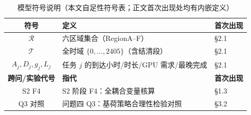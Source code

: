 
\begin{table}[ht]
\centering
\caption{模型符号说明（本文自足性符号表；正文首次出现处均有内嵌定义）}
\begin{tabular}{c l l}
\toprule
\textbf{符号} & \textbf{定义} & \textbf{首次出现} \\
\midrule
$\mathcal{R}$ & 六区域集合（RegionA--F） & §2.1 \\
$\mathcal{T}$ & 全时域 $\{0,\ldots,2405\}$（含结清段） & §2.1 \\
$A_j, D_j, g_j, L_j$ & 任务 $j$ 的到达小时/时长/GPU 需求/最晚完成 & §2.1 \\
\toprule
\textbf{跨问/实验代号} & \textbf{指代} & \textbf{首次出现} \\
\midrule
S2 F4 & S2 阶段 F4：全耦合变量核算 & §1.3 \\
Q3 对照 & 问题四 Q3：基荷策略合理性检验对照 & §3.2 \\
\bottomrule
\end{tabular}
\end{table}
